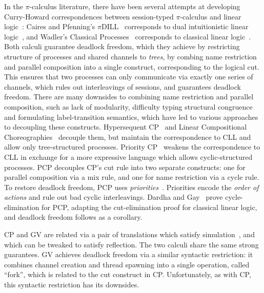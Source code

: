 In the $\pi$-calculus literature, there have been several attempts at developing Curry-Howard correspondences between session-typed $\pi$-calculus and linear logic~\cite{girard87}: Caires and Pfenning's $\pi$DILL~\cite{cairespfenning10} corresponds to dual intuitionistic linear logic~\cite{barber96}, and Wadler's Classical Processes~\cite[CP]{wadler14} corresponds to classical linear logic~\cite[CLL]{girard87}. Both calculi guarantee deadlock freedom, which they achieve by restricting structure of processes and shared channels to \emph{trees}, by combing name restriction and parallel composition into a single construct, corresponding to the logical cut. This ensures that two processes can only communicate via exactly one series of channels, which rules out interleavings of sessions, and guarantees deadlock freedom.
There are many downsides to combining name restriction and parallel composition, such as lack of modularity, difficulty typing structural congruence and formulating label-transition semantics, which have led to various approaches to decoupling these constructs. Hypersequent CP~\cite{MP18,kokkemontesi19popl,kokkemontesi19tlla} and Linear Compositional Choreographies~\cite{CarboneMS18} decouple them, but maintain the correspondence to CLL and allow only tree-structured processes. Priority CP~\cite[PCP]{dardhagay18extended} weakens the correspondence to CLL in exchange for a more expressive language which allows cyclic-structured processes. PCP decouples CP's cut rule into two separate constructs: one for parallel composition via a mix rule, and one for name restriction via a cycle rule. To restore deadlock freedom, PCP uses \emph{priorities}~\cite{kobayashi06,padovani14}. Priorities encode the \emph{order of actions} and rule out bad cyclic interleavings. Dardha and Gay~\cite{dardhagay18extended} prove cycle-elimination for PCP, adapting the cut-elimination proof for classical linear logic, and deadlock freedom follows as a corollary.

CP and GV are related via a pair of translations which satisfy simulation~\cite{lindleymorris16}, and which can be tweaked to satisfy reflection. The two calculi share the same strong guarantees. GV achieves deadlock freedom via a similar syntactic restriction: it combines channel creation and thread spawning into a single operation, called ``fork'', which is related to the cut construct in CP. Unfortunately, as with CP, this syntactic restriction has its downsides.

